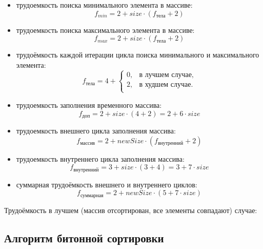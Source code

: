 \begin{itemize}
	\item трудоемкость поиска минимального элемента в массиве:
	\begin{equation}
		\label{min}
		f_{min} =  2 + size \cdot (f_{\text{тела}} + 2)
	\end{equation}

	\item трудоемкость поиска максимального элемента в массиве:
	\begin{equation}
		\label{max}
		f_{max} =  2 + size \cdot (f_{\text{тела}} + 2)
	\end{equation}
			
	\item трудоёмкость каждой итерации цикла поиска минимального и максимального элемента:
	\begin{equation}
	\label{min_max_if}
	f_{\text{тела}} = 4 + \begin{cases}
		0, & \text{в лучшем случае},\\
		2, & \text{в худшем случае}.\\
	\end{cases}
	\end{equation}

	\item трудоемкость заполнения временного массива:
	\begin{equation}
		\label{newArray}
		f_{\text{доп}} = 2 + size \cdot (4 + 2) = 2 + 6 \cdot size
	\end{equation}

	\item трудоемкость внешнего цикла заполнения массива:
	\begin{equation}
		\label{array}
		f_{\text{массив}} = 2 + newSize \cdot (f_{\text{внутренний}} + 2) 
	\end{equation}

	\item трудоемкость внутреннего цикла заполнения массива:
	\begin{equation}
		\label{innerArray}
		f_{\text{внутренний}} = 3 + size \cdot (3 + 4)  = 3 + 7 \cdot size 
	\end{equation}
	
	\item суммарная трудоёмкость внешнего и внутреннего циклов:
	\begin{equation}
		\label{array}
		f_{\text{суммарная}} = 2 + newSize \cdot (5 + 7 \cdot size) 
	\end{equation}
\end{itemize}

Трудоёмкость в лучшем (массив отсортирован, все элементы совпадают) случае:

\subsection{Алгоритм битонной сортировки}